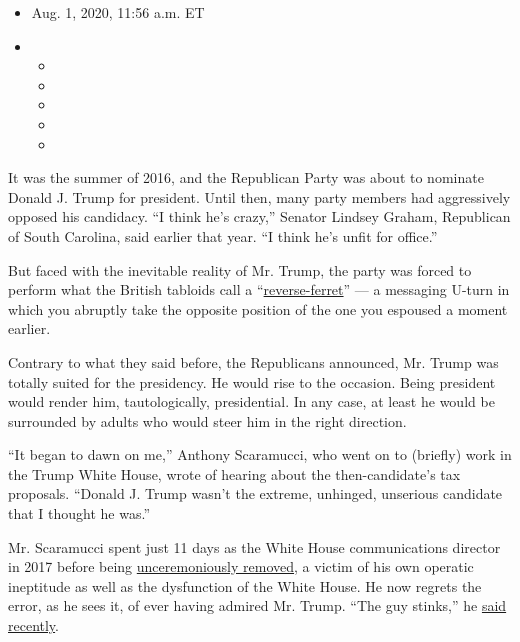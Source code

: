\begin{itemize}
\item
  Aug. 1, 2020, 11:56 a.m. ET
\item
  \begin{itemize}
  \item
  \item
  \item
  \item
  \item
  \end{itemize}
\end{itemize}

It was the summer of 2016, and the Republican Party was about to
nominate Donald J. Trump for president. Until then, many party members
had aggressively opposed his candidacy. ``I think he's crazy,'' Senator
Lindsey Graham, Republican of South Carolina, said earlier that year.
``I think he's unfit for office.''

But faced with the inevitable reality of Mr. Trump, the party was forced
to perform what the British tabloids call a
``\href{https://www.forbes.com/sites/andrewbusby/2019/03/29/the-reverse-ferret-and-the-department-store-how-today-became-debs-day/\#6eebddc017de}{reverse-ferret}''
--- a messaging U-turn in which you abruptly take the opposite position
of the one you espoused a moment earlier.

Contrary to what they said before, the Republicans announced, Mr. Trump
was totally suited for the presidency. He would rise to the occasion.
Being president would render him, tautologically, presidential. In any
case, at least he would be surrounded by adults who would steer him in
the right direction.

``It began to dawn on me,'' Anthony Scaramucci, who went on to (briefly)
work in the Trump White House, wrote of hearing about the
then-candidate's tax proposals. ``Donald J. Trump wasn't the extreme,
unhinged, unserious candidate that I thought he was.''

Mr. Scaramucci spent just 11 days as the White House communications
director in 2017 before being
\href{https://www.nytimes.com/2017/07/31/us/politics/trump-white-house-obamacare-health.html}{unceremoniously
removed}, a victim of his own operatic ineptitude as well as the
dysfunction of the White House. He now regrets the error, as he sees it,
of ever having admired Mr. Trump. ``The guy stinks,'' he
\href{https://www.theguardian.com/tv-and-radio/2020/jul/17/the-guy-stinks-and-hes-a-racist-anthony-scaramucci-on-donald-trump}{said
recently}.

